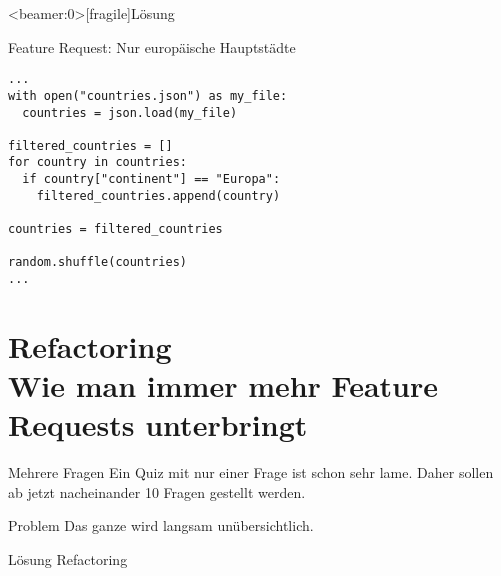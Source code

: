 \begin{frame}<beamer:0>[fragile]{Lösung}
	
\begin{solutionblock}{Feature Request: Nur europäische Hauptstädte}
\begin{verbatim}
...
with open("countries.json") as my_file:
  countries = json.load(my_file)

filtered_countries = []
for country in countries: 
  if country["continent"] == "Europa": 
    filtered_countries.append(country)

countries = filtered_countries

random.shuffle(countries)
...
\end{verbatim}
\end{solutionblock}
\end{frame}

\section{Refactoring \\ \footnotesize{Wie man immer mehr Feature Requests unterbringt}}

\begin{frame}
	
\begin{block}{Mehrere Fragen}
\vspace{2pt}
Ein Quiz mit nur einer Frage ist schon sehr lame. Daher sollen ab jetzt nacheinander 10 Fragen gestellt werden. 	
\end{block}

\pause 
\vspace{12pt}

\begin{alertblock}{Problem}
\vspace{2pt}
Das ganze wird langsam unübersichtlich.	
\end{alertblock}

\pause
\vspace{12pt}
\begin{exampleblock}{Lösung}
	\vspace{2pt}
Refactoring
\end{exampleblock}

\end{frame}

